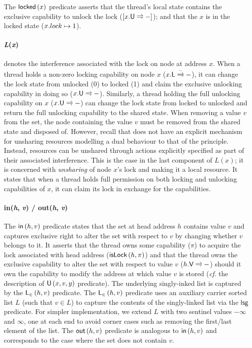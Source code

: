 The $\textsf{locked}\left(x \right)$ predicate asserts that the thread's local state contains the exclusive capability to unlock the lock ($[\unlockT{x}]$); and that the $x$ is in the locked state ($x.lock \mapsto 1$). 

\paragraph{\textbf{\textit{L}\textsf{(}\textit{x}\textsf{)}}} denotes the interference associated with the lock on node at address $x$. When a thread holds a non-zero locking capability on node $x$ ($\lockC{x}[-]$), it can change the lock state from unlocked (0) to locked (1) and claim the exclusive unlocking capability in doing so ($\unlockC{x}$). 
Similarly, a thread holding the full unlocking capability on $x$ ($\unlockC{x}$) can change the lock state from locked to unlocked and return the full unlocking capability to the shared state. 
When removing a value $v$ from the set, the node containing the value $v$ must be removed from the shared state and disposed of. However, recall that \colosl does not have an explicit mechanism for unsharing resources modelling a dual behaviour to that of the \extendRule principle. Instead, resources can be unshared through actions explicitly specified as part of their associated interference. This is the case in the last component of $L(x)$; it is concerned with \emph{unsharing} of node $x$'s lock and making it a local resource. It states that when a thread holds full permission on both locking and unlocking capabilities of $x$, it can claim its lock in exchange for the capabilities. 

\paragraph{\textbf{\textsf{in(}\textit{h}, \textit{v}\textsf{)} / \textsf{out(}\textit{h}, \textit{v}\textsf{)}}}
The $\textsf{in}\left(h, v\right)$ predicate states that the set at head address $h$ contains value $v$ and captures exclusive right to alter the set with respect to $v$ by changing whether $v$ belongs to it. It asserts that the thread owns some capability ($\pi$) to acquire the lock associated with head address ($\textsf{isLock}\left(h, \pi\right)$) and that the thread owns the exclusive capability to alter the set with respect to value $v$ ($\valueC{h}{v}$) should it own the capability to modify the address at which value $v$ is stored (\textit{cf.} the description of $\textsf{U}\left(x, v, y\right)$ predicate). The underlying singly-inked list is captured by the $\textsf{L}_{\in}\left(h, v \right)$ predicate. 
The $\textsf{L}_{\in}\left(h, v \right)$ predicate uses an auxiliary carrier sorted list $L$ (such that $v \in L$) to capture the contents of the singly-linked list via the $\textsf{lsg}$ predicate. For simpler implementation, we extend $L$ with two sentinel values $-\infty$ and $\infty$, one at each end to avoid corner cases such as removing the first/last element of the list. The $\textsf{out}\left(h, v\right)$ predicate is analogous to $\textsf{in}\left(h, v\right)$ and corresponds to the case where the set does not contain $v$.

